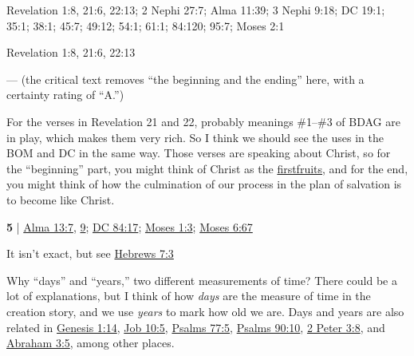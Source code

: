 	\begin{compactdesc}
	
		\item[beginning and the end] Revelation 1:8, 21:6, 22:13; 2 Nephi 27:7; Alma 11:39; 3 Nephi 9:18; DC 19:1; 35:1; 38:1; 45:7; 49:12; 54:1; 61:1; 84:120; 95:7; Moses 2:1
			\begin{compactdesc}
				\item[Bible anchor verses] Revelation 1:8, 21:6, 22:13
					\begin{compactdesc}
						\item[Revelation 1:8] --- (the critical text removes ``the beginning and the ending'' here, with a certainty rating of ``A.'')
						\item[Revelation 21:6] 
						\item[Revelation 22:13] 
					\end{compactdesc}
				\item[Commentary] For the verses in Revelation 21 and 22, probably meanings \#1--\#3 of BDAG are in play, which makes them very rich. So I think we should see the uses in the BOM and DC in the same way. Those verses are speaking about Christ, so for the ``beginning'' part, you might think of Christ as the \hyperref[FIRSTFRUITS]{firstfruits}, and for the end, you might think of how the culmination of our process in the plan of salvation is to become like Christ.
			\end{compactdesc}
			
		\item[beginning of days, end of years] \textbf{5} | \hyperref[ALMA-13-7]{Alma 13:7}, \hyperref[ALMA-13-9]{9}; \hyperref[DC84-17]{DC 84:17}; \hyperref[MOSES-1-3]{Moses 1:3}; \hyperref[MOSES-6-67]{Moses 6:67}
			\begin{compactdesc}
				\item[Bible anchor verses] It isn't exact, but see \hyperref[HEBREWS-7-3]{Hebrews 7:3}
				\item[Commentary] Why ``days'' and ``years,'' two different measurements of time? There could be a lot of explanations, but I think of how \textit{days} are the measure of time in the creation story, and we use \textit{years} to mark how old we are. Days and years are also related in \hyperref[GENESIS-1-14]{Genesis 1:14}, \hyperref[JOB-10-5]{Job 10:5}, \hyperref[PSALMS-77-5]{Psalms 77:5}, \hyperref[PSALMS-90-10]{Psalms 90:10}, \hyperref[2PETER-3-8]{2 Peter 3:8}, and \hyperref[ABRAHAM-3-5]{Abraham 3:5}, among other places.
			\end{compactdesc}
			

\end{compactdesc}
